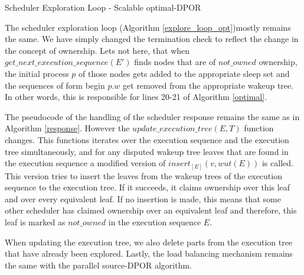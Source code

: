 \begin{algorithm}
    \caption{Scheduler Exploration Loop - Scalable optimal-DPOR}
    \label{explore_loop_opt}
\end{algorithm}

The scheduler exploration loop (Algorithm \ref{explore_loop_opt})mostly remains the same. We have simply changed the termination
check to reflect the change in the concept of ownership. Lets not here, that when $get\_next\_execution\_sequence(E')$ finds nodes that are of $not\_owned$ ownership, the initial process $p$ of those nodes gets added to the appropriate sleep set and the sequences of form begin $p.w$ get removed from the appropriate wakeup tree. In other words, this is responsible for lines 20-21 of Algorithm \ref{optimal}.

The pseudocode of the handling of the scheduler response remains the same as in Algorithm \ref{response}. However the $update\_execution\_tree(E, T)$ function changes. This functions iterates over the execution sequence and the execution tree simultaneously,
and for any disputed wakeup tree leaves that are found in the execution sequence a modified version of $insert_{[E]}(v,wut(E))$ is called.
This version tries to insert the leaves from the wakeup trees of the execution sequence to the execution tree. If it succeeds, it claims ownership over this leaf and over every equivalent leaf. If no insertion is made, this means that some other scheduler has claimed ownership over an equivalent leaf and therefore, this leaf is marked as $not\_owned$ in the execution sequence $E$.

When updating the execution tree, we also delete parts from the execution tree that have already been explored.
Lastly, the load balancing mechanism remains the same with the parallel source-DPOR algorithm.